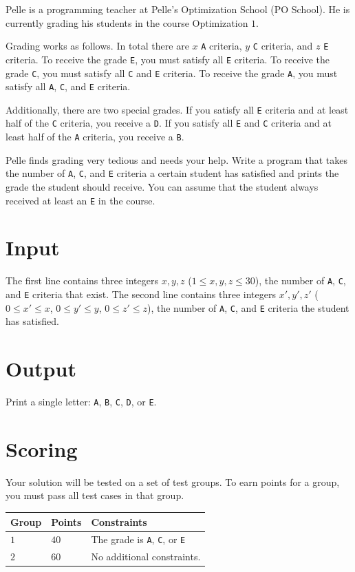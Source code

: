 Pelle is a programming teacher at Pelle's Optimization School (PO School).
He is currently grading his students in the course Optimization $1$.

Grading works as follows.
In total there are $x$ \texttt{A} criteria, $y$ \texttt{C} criteria, and $z$ \texttt{E} criteria.
To receive the grade \texttt{E}, you must satisfy all \texttt{E} criteria.
To receive the grade \texttt{C}, you must satisfy all \texttt{C} and \texttt{E} criteria.
To receive the grade \texttt{A}, you must satisfy all \texttt{A}, \texttt{C}, and \texttt{E} criteria.

Additionally, there are two special grades.
If you satisfy all \texttt{E} criteria and at least half of the \texttt{C} criteria, you receive a \texttt{D}.
If you satisfy all \texttt{E} and \texttt{C} criteria and at least half of the \texttt{A} criteria, you receive a \texttt{B}.

Pelle finds grading very tedious and needs your help.
Write a program that takes the number of \texttt{A}, \texttt{C}, and \texttt{E} criteria a certain student has satisfied and prints the grade the student should receive.
You can assume that the student always received at least an \texttt{E} in the course.

\section*{Input}
The first line contains three integers $x, y, z$ ($1 \leq x, y, z \leq 30$), the number of \texttt{A}, \texttt{C}, and \texttt{E} criteria that exist.
The second line contains three integers $x', y', z'$ ($0 \leq x' \leq x$, $0 \leq y' \leq y$, $0 \leq z' \leq z$), the number of \texttt{A}, \texttt{C}, and \texttt{E} criteria the student has satisfied.

\section*{Output}
Print a single letter: \texttt{A}, \texttt{B}, \texttt{C}, \texttt{D}, or \texttt{E}.

\section*{Scoring}
Your solution will be tested on a set of test groups.
To earn points for a group, you must pass all test cases in that group.

\noindent
\begin{tabular}{| l | l | l |}
\hline
Group & Points & Constraints \\ \hline
$1$     & $40$        &  The grade is \texttt{A}, \texttt{C}, or \texttt{E} \\ \hline
$2$     & $60$        &  No additional constraints. \\ \hline
\end{tabular}

